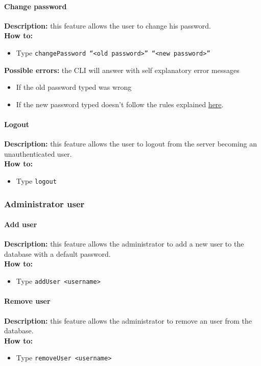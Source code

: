 \documentclass{scalatekids-article}
\begin{document}
\paragraph{Change password}
\label{sec:changepassword}
\textbf{Description:} this feature allows the user to change his password.\\
\textbf{How to:} 
\begin{itemize}
	\item Type \texttt{changePassword ``<old password>'' ``<new password>''}
\end{itemize}
\textbf{Possible errors:} the CLI will answer with self explanatory error messages 
\begin{itemize}
	\item If the old password typed was wrong
	\item If the new password typed doesn't follow the rules explained \hyperref[sec:passwordrequirement]{here}.
\end{itemize}

\paragraph{Logout}
\label{sec:logout}
\textbf{Description:} this feature allows the user to logout from the server becoming an unauthenticated user.\\
\textbf{How to:} 
\begin{itemize}
	\item Type \texttt{logout}
\end{itemize}

\subsubsection{Administrator user}
\label{sec:administratoruser}

\paragraph{Add user}
\label{sec:adduser}
\textbf{Description:} this feature allows the administrator to add a new user to the database with a default password.\\
\textbf{How to:} 
\begin{itemize}
	\item Type \texttt{addUser <username>}
\end{itemize}

\paragraph{Remove user}
\label{sec:removeuser}
\textbf{Description:} this feature allows the administrator to remove an user from the database.\\
\textbf{How to:} 
\begin{itemize}
	\item Type \texttt{removeUser <username>}
\end{itemize}
\end{document}
